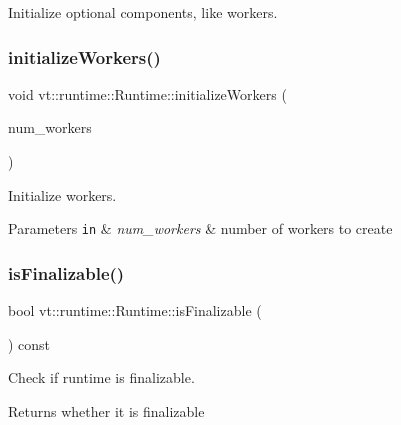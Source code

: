 Initialize optional components, like workers. 

\mbox{\label{structvt_1_1runtime_1_1_runtime_a264ccc1306fc3b5dfc20830fa313cba0}} 
\subsubsection{\texorpdfstring{initialize\+Workers()}{initializeWorkers()}}
{\footnotesize\ttfamily void vt\+::runtime\+::\+Runtime\+::initialize\+Workers (\begin{DoxyParamCaption}\item[{\hyperlink{namespacevt_aa93398ea48f2cb6c188512250f7cc248}{Worker\+Count\+Type} const}]{num\+\_\+workers }\end{DoxyParamCaption})\hspace{0.3cm}{\ttfamily [protected]}}



Initialize workers. 


\begin{DoxyParams}[1]{Parameters}
\mbox{\tt in}  & {\em num\+\_\+workers} & number of workers to create \\
\hline
\end{DoxyParams}
\mbox{\label{structvt_1_1runtime_1_1_runtime_ab18731a9ecde8e326c0e4aa798ee10c7}} 
\subsubsection{\texorpdfstring{is\+Finalizable()}{isFinalizable()}}
{\footnotesize\ttfamily bool vt\+::runtime\+::\+Runtime\+::is\+Finalizable (\begin{DoxyParamCaption}{ }\end{DoxyParamCaption}) const\hspace{0.3cm}{\ttfamily [inline]}}



Check if runtime is finalizable. 

\begin{DoxyReturn}{Returns}
whether it is finalizable 
\end{DoxyReturn}
\mbox{\label{structvt_1_1runtime_1_1_runtime_af8e30c5de7fabc90fb32ce83018e91c8}} 
